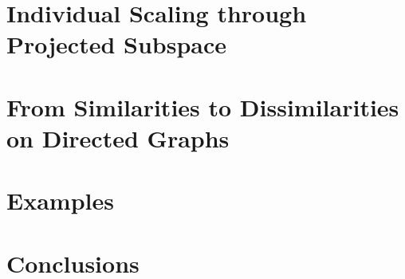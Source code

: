 \documentclass[11pt]{asaproc}
\begin{document}
\section{Individual Scaling through Projected Subspace}
\label{sec:indiv-scal-thro}

\section{From Similarities to Dissimilarities on Directed Graphs}
\label{sec:from-simil-diss}

\section{Examples}
\label{sec:examples}

\section{Conclusions}
\label{sec:conclusions}


\end{document}
